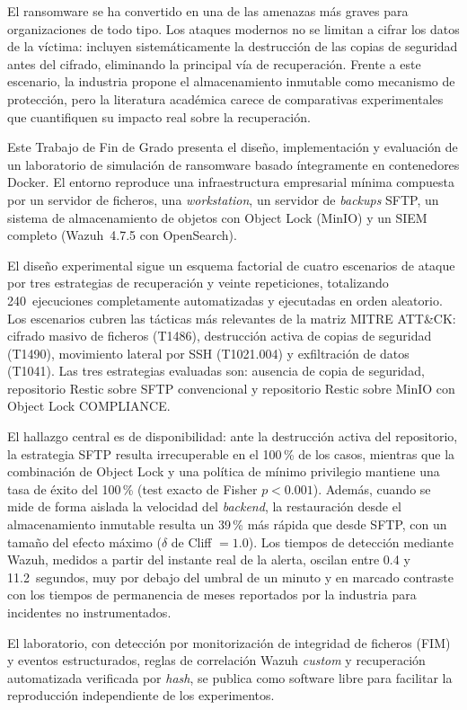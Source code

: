 \documentclass[../main.tex]{subfiles}
\begin{document}
El ransomware se ha convertido en una de las amenazas más graves para
organizaciones de todo tipo. Los ataques modernos no se limitan a cifrar
los datos de la víctima: incluyen sistemáticamente la destrucción de las
copias de seguridad antes del cifrado, eliminando la principal vía de
recuperación. Frente a este escenario, la industria propone el
almacenamiento inmutable como mecanismo de protección, pero la literatura
académica carece de comparativas experimentales que cuantifiquen su impacto
real sobre la recuperación.

Este Trabajo de Fin de Grado presenta el diseño, implementación y evaluación
de un laboratorio de simulación de ransomware basado íntegramente en
contenedores Docker. El entorno reproduce una infraestructura empresarial
mínima compuesta por un servidor de ficheros, una \textit{workstation}, un
servidor de \textit{backups} SFTP, un sistema de almacenamiento de objetos
con Object Lock (MinIO) y un SIEM completo (Wazuh~4.7.5 con OpenSearch).

El diseño experimental sigue un esquema factorial de cuatro escenarios de
ataque por tres estrategias de recuperación y veinte repeticiones,
totalizando 240~ejecuciones completamente automatizadas y ejecutadas en orden
aleatorio. Los escenarios cubren las tácticas más relevantes de la matriz
MITRE ATT\&CK: cifrado masivo de ficheros (T1486), destrucción activa de
copias de seguridad (T1490), movimiento lateral por SSH (T1021.004) y
exfiltración de datos (T1041). Las tres estrategias evaluadas son: ausencia
de copia de seguridad, repositorio Restic sobre SFTP convencional y
repositorio Restic sobre MinIO con Object Lock COMPLIANCE.

El hallazgo central es de disponibilidad: ante la destrucción activa del
repositorio, la estrategia SFTP resulta irrecuperable en el 100\,\% de los
casos, mientras que la combinación de Object Lock y una política de mínimo
privilegio mantiene una tasa de éxito del 100\,\% (test exacto de Fisher
$p < 0.001$). Además, cuando se mide de forma aislada la velocidad del
\textit{backend}, la restauración desde el almacenamiento inmutable resulta
un 39\,\% más rápida que desde SFTP, con un tamaño del efecto máximo
($\delta$ de Cliff $=1.0$). Los tiempos de detección mediante Wazuh, medidos
a partir del instante real de la alerta, oscilan entre 0.4 y 11.2~segundos,
muy por debajo del umbral de un minuto y en marcado contraste con los tiempos
de permanencia de meses reportados por la industria para incidentes no
instrumentados.

El laboratorio, con detección por monitorización de integridad de ficheros (FIM) y eventos estructurados, reglas de
correlación Wazuh \textit{custom} y recuperación automatizada verificada por
\textit{hash}, se publica como software libre para facilitar la reproducción
independiente de los experimentos.
\end{document}
